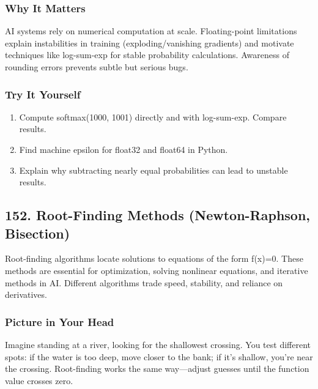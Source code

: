 \documentclass[
  letterpaper,
  DIV=11,
  numbers=noendperiod]{scrreprt}
\providecommand{\tightlist}{%
  \setlength{\itemsep}{0pt}\setlength{\parskip}{0pt}}
\begin{document}
\subsubsection{Why It Matters}\label{why-it-matters-48}

AI systems rely on numerical computation at scale. Floating-point
limitations explain instabilities in training (exploding/vanishing
gradients) and motivate techniques like log-sum-exp for stable
probability calculations. Awareness of rounding errors prevents subtle
but serious bugs.

\subsubsection{Try It Yourself}\label{try-it-yourself-150}

\begin{enumerate}
\def\labelenumi{\arabic{enumi}.}
\tightlist
\item
  Compute softmax(1000, 1001) directly and with log-sum-exp. Compare
  results.
\item
  Find machine epsilon for float32 and float64 in Python.
\item
  Explain why subtracting nearly equal probabilities can lead to
  unstable results.
\end{enumerate}

\subsection{152. Root-Finding Methods (Newton-Raphson,
Bisection)}\label{root-finding-methods-newton-raphson-bisection}

Root-finding algorithms locate solutions to equations of the form
f(x)=0. These methods are essential for optimization, solving nonlinear
equations, and iterative methods in AI. Different algorithms trade
speed, stability, and reliance on derivatives.

\subsubsection{Picture in Your Head}\label{picture-in-your-head-151}

Imagine standing at a river, looking for the shallowest crossing. You
test different spots: if the water is too deep, move closer to the bank;
if it's shallow, you're near the crossing. Root-finding works the same
way---adjust guesses until the function value crosses zero.
\end{document}
